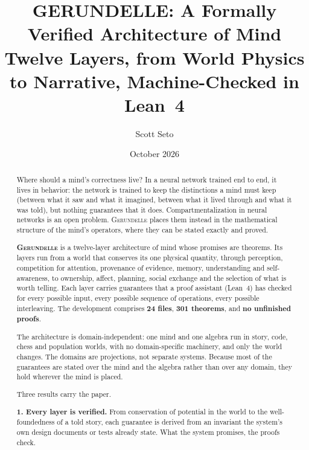 \documentclass[11pt]{article}
\title{\textbf{GERUNDELLE: A Formally Verified Architecture of Mind} \\[0.5em]
\large Twelve Layers, from World Physics to Narrative, Machine-Checked in Lean~4}
\author{Scott Seto}
\affil{Independent Researcher}
\date{October 2026}
\newcommand{\gerundelle}{\textsc{Gerundelle}}
\theoremstyle{remark}
\begin{document}

\maketitle


\begin{abstract}

Where should a mind's correctness live? In a neural network trained end to end, it lives in
behavior: the network is trained to keep the distinctions a mind must keep (between what it
saw and what it imagined, between what it lived through and what it was told), but nothing
guarantees that it does. Compartmentalization in neural networks is an open problem.
\gerundelle{} places them instead
in the mathematical structure of the mind's operators, where they can be stated exactly and
proved.

\textbf{\gerundelle{}} is a twelve-layer architecture of mind whose promises are theorems.
Its layers run from a world that conserves its one physical quantity, through perception,
competition for attention, provenance of evidence, memory, understanding and self-awareness,
to ownership, affect, planning, social exchange and the selection of what is worth telling.
Each layer carries guarantees that a proof assistant (Lean~4) has checked for every possible
input, every possible sequence of operations, every possible interleaving. The development
comprises \textbf{24 files}, \textbf{301 theorems}, and \textbf{no unfinished proofs}.

The architecture is domain-independent: one mind and one algebra run in story, code, chess
and population worlds, with no domain-specific machinery, and only the world changes. The
domains are projections, not separate systems. Because most of the guarantees are stated
over the mind and the algebra rather than over any domain, they hold wherever the mind is
placed.

Three results carry the paper.

\textbf{1. Every layer is verified.} From conservation of potential in the world to the
well-foundedness of a told story, each guarantee is derived from an invariant the system's
own design documents or tests already state. What the system promises, the proofs check.


\end{abstract}
\end{document}
